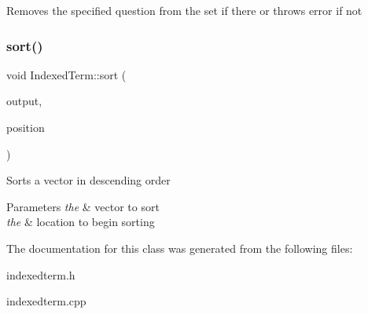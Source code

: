 Removes the specified question from the set if there or throws error if not \mbox{\label{classIndexedTerm_a923c8542c47170f848610bd7132eb71d}} 
\subsubsection{\texorpdfstring{sort()}{sort()}}
{\footnotesize\ttfamily void Indexed\+Term\+::sort (\begin{DoxyParamCaption}\item[{std\+::vector$<$ question\+Index $>$ \&}]{output,  }\item[{int}]{position }\end{DoxyParamCaption})}

Sorts a vector in descending order 
\begin{DoxyParams}{Parameters}
{\em the} & vector to sort \\
\hline
{\em the} & location to begin sorting \\
\hline
\end{DoxyParams}


The documentation for this class was generated from the following files\+:\begin{DoxyCompactItemize}
\item 
indexedterm.\+h\item 
indexedterm.\+cpp\end{DoxyCompactItemize}
